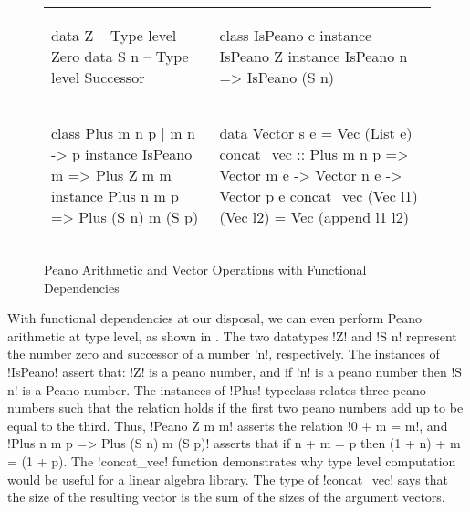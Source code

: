 \documentclass[format=acmsmall,manuscript,review,screen,nonacm,margin=1in,11pt]{acmart}
\begin{document}
\begin{figure}[ht]
  \footnotesize
  \begin{tabular}{l l}
\begin{code}
data Z   -- Type level Zero
data S n -- Type level Successor
\end{code}&%
\begin{code}
class IsPeano c
instance IsPeano Z
instance IsPeano n => IsPeano (S n)
\end{code}\\
\begin{code}
class Plus m n p | m n -> p
instance IsPeano m => Plus Z m m
instance Plus n m p => Plus (S n) m (S p)
\end{code}&%
\begin{code}
data Vector s e = Vec (List e)
concat_vec :: Plus m n p
     => Vector m e -> Vector n e -> Vector p e
concat_vec (Vec l1) (Vec l2) = Vec (append l1 l2)
\end{code}
  \end{tabular}
  \caption{Peano Arithmetic and Vector Operations with Functional Dependencies}
  \label{fig:peano-arith}
\end{figure}

With functional dependencies at our disposal, we can even perform Peano arithmetic at type level,
as shown in . The two datatypes !Z! and !S n!
represent the number zero and successor of a number !n!, respectively.
The instances of !IsPeano! assert that: !Z! is a peano number, and if !n! is a peano number
then !S n! is a Peano number. The instances of !Plus! typeclass relates three peano numbers such that the relation
holds if the first two peano numbers add up to be equal to the third. Thus, !Peano Z m m! asserts the relation
!0 + m = m!, and !Plus n m p => Plus (S n) m (S p)! asserts that if n + m = p then (1 + n) + m = (1 + p).
The !concat_vec! function demonstrates why type level computation would be useful
for a linear algebra library. The type of !concat_vec! says that the size of the resulting
vector is the sum of the sizes of the argument vectors.
\end{document}
